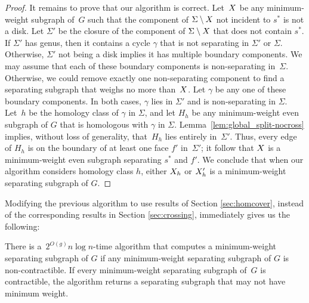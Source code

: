 \documentclass[letterpaper,review]{siamart190516}
\def\rnote#1{\color{red}Review: #1 \color{black}}
\def\knote#1{\textcolor{olive}{Kyle: #1}}
\begin{document}
{\begin{proof}
It remains to prove that our algorithm is correct.  Let~$X$ be any minimum-weight subgraph
of~$G$ such that the component of $\Sigma \setminus X$ not incident to $s^*$ is not a disk.
Let $\Sigma'$ be the closure of the component of $\Sigma \setminus X$ that does not contain
$s^*$.  
If \(\Sigma'\) has genus, then it contains a cycle $\gamma$ that is not separating in $\Sigma'$ or
\(\Sigma\).
Otherwise, \(\Sigma'\) not being a disk implies it has multiple boundary components.
We may assume that each of these boundary components is non-separating in~\(\Sigma\).
Otherwise, we could remove exactly one non-separating component to find a separating subgraph that
weighs no more than~\(X\).
Let \(\gamma\) be any one of these boundary components.
In both cases, \(\gamma\) lies in \(\Sigma'\) and is non-separating in \(\Sigma\).
Let~$h$ be the homology class of $\gamma$ in
$\Sigma$, and let $H_h$ be any minimum-weight even subgraph of $G$ that is homologous with $\gamma$
in $\Sigma$.  Lemma~\ref{lem:global_split-nocross} implies, without loss of generality, that~$H_h$
lies entirely in~$\Sigma'$.  Thus, every edge of $H_h$ is on the boundary of at least one face $f'$
in~$\Sigma'$; it follow that $X$ is a minimum-weight even subgraph separating $s^*$ and $f'$.  We conclude that when our algorithm considers homology class $h$, either $X_h$ or $X'_h$ is a minimum-weight separating subgraph of $G$.
\end{proof}

Modifying the previous algorithm to use results of Section \ref{sec:homcover}, instead of the corresponding results in Section \ref{sec:crossing}, immediately gives us the following:

\begin{lemma}
\label{lem:global_split-alg2}
There is a~$2^{O(g)} n \log n$-time algorithm that computes a minimum-weight separating subgraph of $G$ if any minimum-weight separating subgraph of $G$ is non-contractible.  If every minimum-weight separating subgraph of~$G$ is contractible, the algorithm returns a separating subgraph that may not have minimum weight.
\end{lemma}

}
\end{document}
